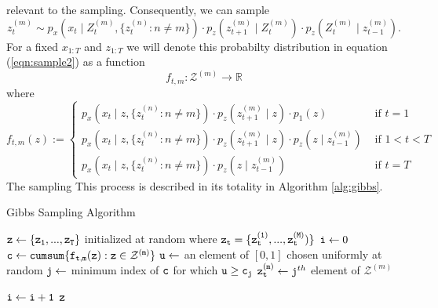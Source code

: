 \documentclass{amsart}
\begin{document}
relevant to the sampling. Consequently, we can sample 
\begin{equation}\label{eqn:sample2}
z_t^{(m)}\sim p_x(x_t\mid Z_t^{(m)},\{z_t^{(n)}:n\neq m\})\cdot
p_z(z_{t+1}^{(m)}\mid Z_t^{(m)})\cdot
p_z(Z_t^{(m)}\mid z_{t-1}^{(m)}).
\end{equation}
For a fixed $x_{1:T}$ and $z_{1:T}$ we will denote this probabilty distribution 
in equation (\ref{eqn:sample2}) as a function 
\[
f_{t,m}:\mathcal Z^{(m)}\rightarrow \mathbb{R}
\]
where 
\[
f_{t,m}(z) := \begin{cases}
p_x(x_t\mid z,\{z_t^{(n)}:n\neq m\})\cdot
p_z(z_{t+1}^{(m)}\mid z)\cdot
p_1(z)& \text{ if }t=1\\
p_x(x_t\mid z,\{z_t^{(n)}:n\neq m\})\cdot
p_z(z_{t+1}^{(m)}\mid z)\cdot
p_z(z\mid z_{t-1}^{(m)})& \text{ if }1<t<T\\
p_x(x_t\mid z,\{z_t^{(n)}:n\neq m\})\cdot
p_z(z\mid z_{t-1}^{(m)})& \text{ if }t=T
\end{cases}
\]
The sampling This process is described in its totality in Algorithm \ref{alg:gibbs}.  


\begin{algorithm}
  \caption{Gibbs Sampling Algorithm\label{alg:gibbs}}
  \begin{algorithmic}[1]
    \State $\tt{z}\leftarrow \{z_1,...,z_T\}$ initialized at random where 
    $\tt{z}_t=\{z_t^{(1)},...,z_t^{(M)})\}$
    \State ${\tt i}\leftarrow 0$
        \State ${\tt c} \leftarrow {\tt cumsum \{f_{t,m}(z):z\in \mathcal 
        Z^{(m)}\}}$ 
        \label{eqn:alg_prob}
        \State ${\tt u}\leftarrow$ an element of $[0,1]$ chosen uniformly at 
        random
        \State ${\tt j}\leftarrow$ minimum index of ${\tt c}$ for which 
        $\tt{u}\geq c_j$
        \State ${\tt z_t^{(m)}}\leftarrow {\tt j}^{th}$ element of $\mathcal Z^{(m)}$

      \EndFor
      \State ${\tt i}\leftarrow {\tt i+1}$
      \EndWhile
      \State\Return ${\tt z}$
    \EndFunction
  \end{algorithmic}
\end{algorithm}
\end{document}
